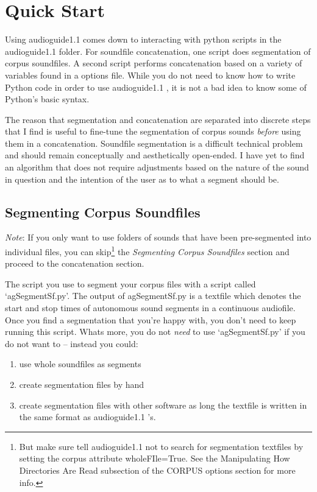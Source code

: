 \documentclass{article}
\newcommand{\ag}{audioguide1.1 }
\begin{document}
\begin{spacing}{1.2}
\begin{description}
\end{description}

  


\section{Quick Start}
Using \ag comes down to interacting with python scripts in the \ag folder.  For soundfile concatenation, one script does segmentation of corpus soundfiles.  A second script performs concatenation based on a variety of variables found in a options file.  While you do not need to know how to write Python code in order to use \ag, it is not a bad idea to know some of Python's basic syntax.

The reason that segmentation and concatenation are separated into discrete steps that I find is useful to fine-tune the segmentation of corpus sounds \emph{before} using them in a concatenation.  Soundfile segmentation is a difficult technical problem and should remain conceptually and aesthetically open-ended.  I have yet to find an algorithm that does not require adjustments based on the nature of the sound in question and the intention of the user as to what a segment should be.


\subsection{Segmenting Corpus Soundfiles}
\emph{Note}: If you only want to use folders of sounds that have been pre-segmented into individual files, you can skip\footnote{But make sure tell \ag not to search for segmentation textfiles by setting the corpus attribute wholeFIle=True.  See the Manipulating How Directories Are Read subsection of the CORPUS options section for more info.} the \emph{Segmenting Corpus Soundfiles} section and proceed to the concatenation section.

The script you use to segment your corpus files with a script called `agSegmentSf.py'.  The output of agSegmentSf.py is a textfile which denotes the start and stop times of autonomous sound segments in a continuous audiofile.  Once you find a segmentation that you're happy with, you don't need to keep running this script.
Whats more, you do not \emph{need} to use `agSegmentSf.py' if you do not want to -- instead you could:
\begin{enumerate}
\item use whole soundfiles as segments
\item create segmentation files by hand
\item create segmentation files with other software as long the textfile is written in the same format as \ag's.
\end{enumerate}


\end{spacing}
\end{document}
